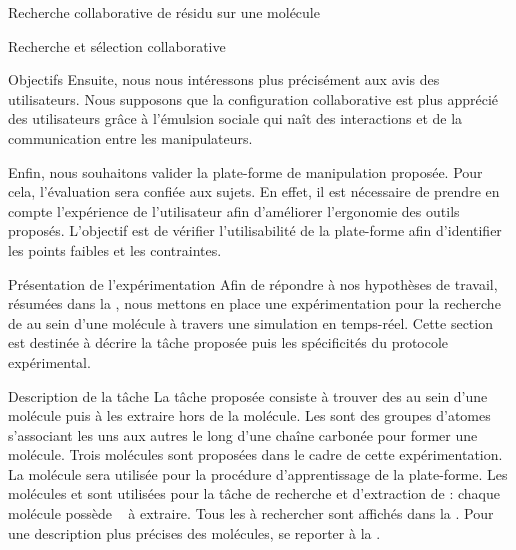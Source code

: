\documentclass[myfrancais,ngerman,english,frenchb]{mythesis}
\begin{document}
\begin{mychapter}{Recherche collaborative de résidu sur une molécule}
\begin{mysection}{Recherche et sélection collaborative}
\begin{mysubsection}{Objectifs}
				Ensuite, nous nous intéressons plus précisément aux avis des utilisateurs.
				Nous supposons que la configuration collaborative est plus apprécié des utilisateurs grâce à l'émulsion sociale qui naît des interactions et de la communication entre les manipulateurs.

				Enfin, nous souhaitons valider la plate-forme de manipulation proposée.
				Pour cela, l'évaluation sera confiée aux sujets.
				En effet, il est nécessaire de prendre en compte l'expérience de l'utilisateur afin d'améliorer l'ergonomie des outils proposés.
				L'objectif est de vérifier l'utilisabilité de la plate-forme afin d'identifier les points faibles et les contraintes.
			\end{mysubsection}
		\end{mysection}
		\begin{mysection}{Présentation de l'expérimentation}
			Afin de répondre à nos hypothèses de travail, résumées dans la , nous mettons en place une expérimentation pour la recherche de  au sein d'une molécule à travers une simulation en temps-réel.
			Cette section est destinée à décrire la tâche proposée puis les spécificités du protocole expérimental.
			\begin{mysubsection}{Description de la tâche}
				La tâche proposée consiste à trouver des  au sein d'une molécule puis à les extraire hors de la molécule.
				Les  sont des groupes d'atomes s'associant les uns aux autres le long d'une chaîne carbonée pour former une molécule.
				Trois molécules sont proposées dans le cadre de cette expérimentation.
				La molécule \myTRPZIPPER sera utilisée pour la procédure d'apprentissage de la plate-forme.
				Les molécules \myTRPCAGE et \myPrion sont utilisées pour la tâche de recherche et d'extraction de  : chaque molécule possède ~ à extraire.
				Tous les  à rechercher sont affichés dans la .
				Pour une description plus précises des molécules, se reporter à la .


\end{mysubsection}
\end{mysection}
\end{mychapter}
\end{document}
